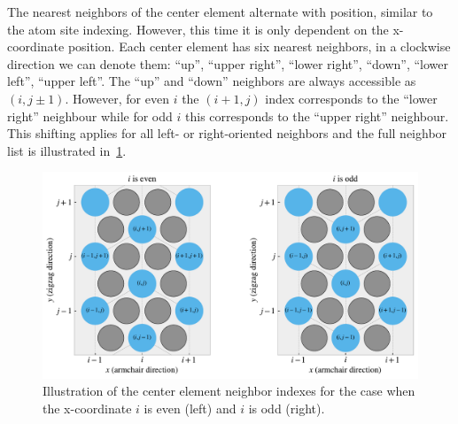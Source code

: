 The nearest neighbors of the center element alternate with position, similar to the atom site indexing. However, this time it is only dependent on the x-coordinate position. Each center element has six nearest neighbors, in a clockwise
direction we can denote them: ``up'', ``upper right'', ``lower right'',
``down'', ``lower left'', ``upper left''. The ``up'' and ``down'' neighbors are always accessible as $(i,j\pm 1)$. However, for even $i$ the $(i+1,j)$ index corresponds to the
``lower right'' neighbour while for odd $i$ this corresponds to the ``upper
right'' neighbour. This shifting applies for all left- or right-oriented neighbors and the full neighbor list is illustrated in~\cref{fig:center_directions}. 

\begin{figure}[h]
  \centering
  \includegraphics[width=0.7\linewidth]{figures/system/center_directions.pdf}
  \caption{Illustration of the center element neighbor indexes for the case when the x-coordinate $i$ is even (left) and $i$ is odd (right).}
  \label{fig:center_directions}
\end{figure}

